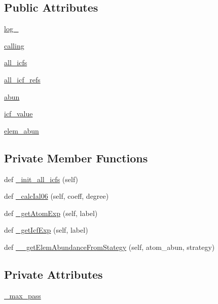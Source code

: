\subsection*{Public Attributes}
\begin{DoxyCompactItemize}
\item 
\hyperlink{classpyneb_1_1core_1_1icf_1_1_i_c_f_a50ae74d7192ec52a1249a675f963461e}{log\+\_\+}
\item 
\hyperlink{classpyneb_1_1core_1_1icf_1_1_i_c_f_aaeb9b3827ef557a32b109baef31da77f}{calling}
\item 
\hyperlink{classpyneb_1_1core_1_1icf_1_1_i_c_f_a854ee87a53feb102e429e902227ce88b}{all\+\_\+icfs}
\item 
\hyperlink{classpyneb_1_1core_1_1icf_1_1_i_c_f_a9777abc7cc843cd5c4d8c5810c1b2ed1}{all\+\_\+icf\+\_\+refs}
\item 
\hyperlink{classpyneb_1_1core_1_1icf_1_1_i_c_f_a16f31533c8f77e2b08988b22df5317b1}{abun}
\item 
\hyperlink{classpyneb_1_1core_1_1icf_1_1_i_c_f_a9dedc0eb2ad90ea08b8be9984e2d832b}{icf\+\_\+value}
\item 
\hyperlink{classpyneb_1_1core_1_1icf_1_1_i_c_f_a59ea6760bd6a09a66dc47b47bcec55c0}{elem\+\_\+abun}
\end{DoxyCompactItemize}
\subsection*{Private Member Functions}
\begin{DoxyCompactItemize}
\item 
def \hyperlink{classpyneb_1_1core_1_1icf_1_1_i_c_f_a109ccae36899c07ffd166b85fd3c0eb4}{\+\_\+init\+\_\+all\+\_\+icfs} (self)
\item 
def \hyperlink{classpyneb_1_1core_1_1icf_1_1_i_c_f_a985320521114915c449f464ee3c62ceb}{\+\_\+calc\+Ial06} (self, coeff, degree)
\item 
def \hyperlink{classpyneb_1_1core_1_1icf_1_1_i_c_f_a6d82c58aa562e61e6074c6b8757583c4}{\+\_\+get\+Atom\+Exp} (self, label)
\item 
def \hyperlink{classpyneb_1_1core_1_1icf_1_1_i_c_f_aa0ed356c2833c48010dfc7aa71a07419}{\+\_\+get\+Icf\+Exp} (self, label)
\item 
def \hyperlink{classpyneb_1_1core_1_1icf_1_1_i_c_f_ad5ac374b51b72067f8be614aa31b73e2}{\+\_\+\+\_\+get\+Elem\+Abundance\+From\+Stategy} (self, atom\+\_\+abun, strategy)
\end{DoxyCompactItemize}
\subsection*{Private Attributes}
\begin{DoxyCompactItemize}
\item 
\hyperlink{classpyneb_1_1core_1_1icf_1_1_i_c_f_a994574a4b1fff9d0700fb483dabc8238}{\+\_\+max\+\_\+pass}
\end{DoxyCompactItemize}


